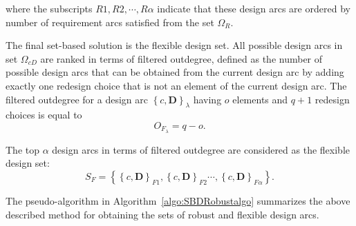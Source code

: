 where the subscripts $R1,R2,\cdots,R\alpha$ indicate that these design arcs are ordered by number of requirement arcs satisfied from the set $\Omega_R$.

The final set-based solution is the flexible design set. All possible design arcs in set $\Omega_{cD}$ are ranked in terms of filtered outdegree, defined as the number of possible design arcs that can be obtained from the current design arc by adding exactly one redesign choice that is not an element of the current design arc. The filtered outdegree for a design arc $\left\{c,\mathbf{D}\right\}_\lambda$ having $o$ elements and $q + 1$ redesign choices is equal to
%
\begin{equation} \label{eq:filteredoutdegree}
	O_{F_{\lambda}} = q - o.
\end{equation}

The top $\alpha$ design arcs in terms of filtered outdegree are considered as the flexible design set:
%
\begin{equation} \label{eq:SBDflexible}
	S_F = \left\{\left\{c,\mathbf{D}\right\}_{F1},\left\{c,\mathbf{D}\right\}_{F2}\cdots,\left\{c,\mathbf{D}\right\}_{F\alpha}\right\}.
\end{equation}

The pseudo-algorithm in Algorithm~\ref{algo:SBDRobustalgo} summarizes the above described method for obtaining the sets of robust and flexible design arcs.

